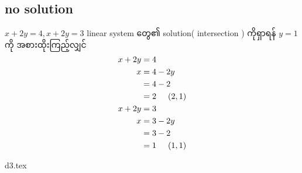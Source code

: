 \subsection*{no solution}
$x+2y=4, x+2y=3$ linear system တွေ၏ solution( intersection ) ကိုရှာရန် $y=1$ ကို အစားထိုးကြည့်လျှင်
\[
    \begin{split}
        x+2y&=4 \\
        x&=4-2y \\
        &=4-2 \\
        &=2\hspace{5mm}(2,1) \\
        x+2y&=3 \\
        x&=3-2y \\
        &=3-2 \\
        &=1\hspace{5mm}(1,1) \\
    \end{split}
\]
\begin{center}
    {d3.tex}
\end{center} 